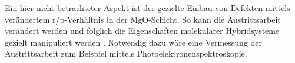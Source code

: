 Ein hier nicht betrachteter Aspekt ist der gezielte Einbau von Defekten mittels verändertem r/p-Verhältnis 
in der MgO-Schicht. So kann die Austrittsarbeit verändert werden und folglich die Eigenschaften molekularer 
Hybridsysteme gezielt manipuliert werden \cite{greiner2012universal}. 
Notwendig dazu wäre eine Vermessung der Austrittsarbeit zum Beispiel mittels Photoelektronenspektroskopie.










